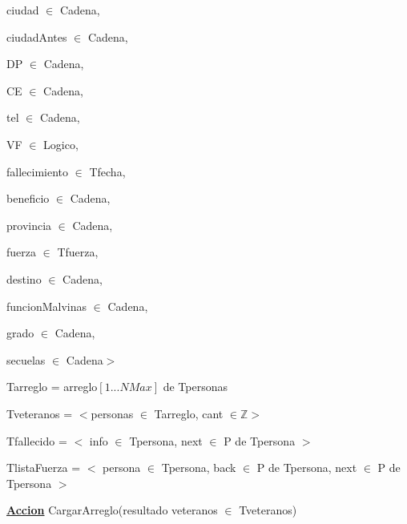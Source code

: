 \documentclass{article}
\begin{document}
        \hspace{8mm}ciudad $\in$ Cadena, 

        \hspace{8mm}ciudadAntes $\in$ Cadena, 
        
        \hspace{8mm}DP $\in$ Cadena, 
        
        \hspace{8mm}CE $\in$ Cadena, 
        
        \hspace{8mm}tel $\in$ Cadena, 
        
        \hspace{8mm}VF $\in$ Logico, 
        
        \hspace{8mm}fallecimiento $\in$ Tfecha,

        \hspace{8mm}beneficio $\in$ Cadena,

        \hspace{8mm}provincia $\in$ Cadena,

        \hspace{8mm}fuerza $\in$ Tfuerza,

        \hspace{8mm}destino $\in$ Cadena,

        \hspace{8mm}funcionMalvinas $\in$ Cadena,

        \hspace{8mm}grado $\in$ Cadena,

        \hspace{8mm}secuelas $\in$ Cadena$>$

    \hspace{4mm}Tarreglo = arreglo$[1...NMax]$ de Tpersonas

    \hspace{4mm}Tveteranos = $<$personas $\in$ Tarreglo, cant $\in \mathbb{Z}$$>$

    \hspace{4mm}Tfallecido = $<$ info $\in$ Tpersona, next $\in$ P de Tpersona $>$

    \hspace{4mm}TlistaFuerza = $<$ persona $\in$ Tpersona, back $\in$ P de Tpersona, next $\in$ P de Tpersona $>$

    \vspace{4mm}

    \hspace{4mm}\underline{\textbf{Accion}} CargarArreglo(resultado veteranos $\in$ Tveteranos)
\end{document}
